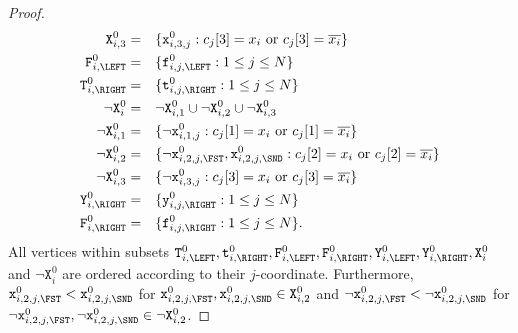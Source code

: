 \begin{proof}
\begin{alignat*}{2}
      \texttt{X}^{0}_{i,3}
      &=
      &&\{\texttt{x}^{0}_{i,3,j} : \text{$c_{j}[3] = x_{i}$ or $c_{j}[3] = \overline{x_{i}}$}\}
      \\
      \texttt{F}^{0}_{i,\LEFT}
      &=
      &&\{\texttt{f}^{0}_{i,j,\LEFT} : 1 \leq j \leq N\}
      \\
      \texttt{T}^{0}_{i,\RIGHT}
      &=
      &&\{\texttt{t}^{0}_{i,j,\RIGHT} : 1 \leq j \leq N\}
      \\
      \neg\texttt{X}^{0}_{i}
      &=
      &&\neg\texttt{X}^{0}_{i,1} \cup \neg\texttt{X}^{0}_{i,2} \cup \neg\texttt{X}^{0}_{i,3}
      \\
      \neg\texttt{X}^{0}_{i,1}
      &=
      &&\{\neg\texttt{x}^{0}_{i,1,j} :
      \text{$c_{j}[1] = x_{i}$ or $c_{j}[1] = \overline{x_{i}}$}\}
      \\
      \neg\texttt{X}^{0}_{i,2}
      &=
      &&\{\neg\texttt{x}^{0}_{i,2,j,\FST}, \texttt{x}^{0}_{i,2,j,\SND} :
      \text{$c_{j}[2] = x_{i}$ or $c_{j}[2] = \overline{x_{i}}$}\}
      \\
      \neg\texttt{X}^{0}_{i,3}
      &=
      &&\{\neg\texttt{x}^{0}_{i,3,j} :
      \text{$c_{j}[3] = x_{i}$ or $c_{j}[3] = \overline{x_{i}}$}\}
      \\
      \texttt{Y}^{0}_{i,\RIGHT}
      &=
      &&\{\texttt{y}^{0}_{i,j,\RIGHT} : 1 \leq j \leq N\}
      \\
      \texttt{F}^{0}_{i,\RIGHT}
      &=
      &&\{\texttt{f}^{0}_{i,j,\RIGHT} : 1 \leq j \leq N\}\text{.}
    \end{alignat*}
    All vertices within subsets
    $\texttt{T}^{0}_{i,\LEFT}, \texttt{t}^{0}_{i,\RIGHT},
    \texttt{F}^{0}_{i,\LEFT}, \texttt{F}^{0}_{i,\RIGHT},
    \texttt{Y}^{0}_{i,\LEFT}, \texttt{Y}^{0}_{i,\RIGHT},
    \texttt{X}^{0}_{i}$ and $\neg\texttt{X}^{0}_{i}$
    are ordered according to their $j$-coordinate.
    Furthermore,
    $\texttt{x}^{0}_{i,2,j,\FST} < \texttt{x}^{0}_{i,2,j,\SND}$
    for $\texttt{x}^{0}_{i,2,j,\FST}, \texttt{x}^{0}_{i,2,j,\SND} \in \texttt{X}^{0}_{i,2}$
    and
    $\neg\texttt{x}^{0}_{i,2,j,\FST} < \neg\texttt{x}^{0}_{i,2,j,\SND}$
    for $\neg\texttt{x}^{0}_{i,2,j,\FST}, \neg\texttt{x}^{0}_{i,2,j,\SND} \in \neg\texttt{X}^{0}_{i,2}$.


\end{proof}
